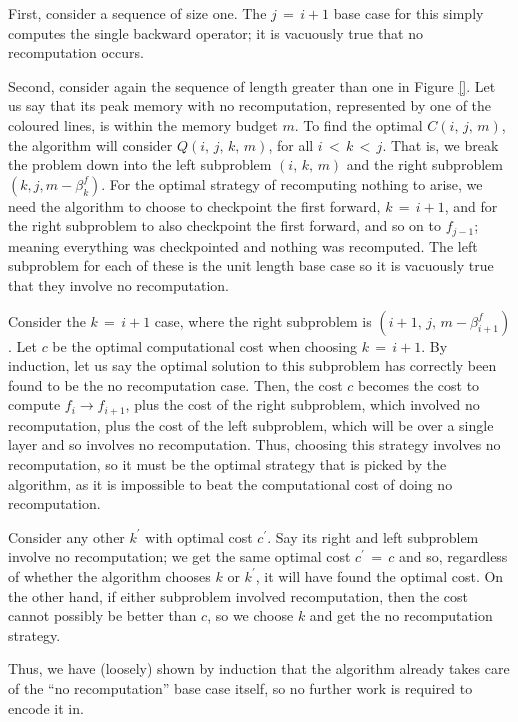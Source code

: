 First, consider a sequence of size one.
The \(j\,=\,i+1\) base case for this simply computes the single backward operator; it is vacuously true that no recomputation occurs.

Second, consider again the sequence of length greater than one in Figure \ref{}.
Let us say that its peak memory with no recomputation, represented by one of the coloured lines, is within the memory budget \(m\).
To find the optimal \(C(i,\,j,\,m)\), the algorithm will consider \(Q(i,\,j,\,k,\,m)\), for all \(i \,<\, k \,<\, j\).
That is, we break the problem down into the left subproblem \((i,\,k,\,m)\) and the right subproblem \((k,j,m-\beta^f_k)\).
For the optimal strategy of recomputing nothing to arise, we need the algorithm to choose to checkpoint the first forward, \(k\,=\,i+1\), and for the right subproblem to also checkpoint the first forward, and so on to \(f_{j-1}\); meaning everything was checkpointed and nothing was recomputed.
The left subproblem for each of these is the unit length base case so it is vacuously true that they involve no recomputation.

Consider the \(k\,=\,i+1\) case, where the right subproblem is \((i+1,\,j,\,m-\beta^f_{i+1})\).
Let \(c\) be the optimal computational cost when choosing \(k\,=\,i+1\).
By induction, let us say the optimal solution to this subproblem has correctly been found to be the no recomputation case.
Then, the cost \(c\) becomes the cost to compute \(f_i\rightarrow f_{i+1}\), plus the cost of the right subproblem, which involved no recomputation, plus the cost of the left subproblem, which will be over a single layer and so involves no recomputation.
Thus, choosing this strategy involves no recomputation, so it must be the optimal strategy that is picked by the algorithm, as it is impossible to beat the computational cost of doing no recomputation.

Consider any other \(k^\prime\) with optimal cost \(c^\prime\).
Say its right and left subproblem involve no recomputation;
we get the same optimal cost \(c^\prime\,=\,c\) and so, regardless of whether the algorithm chooses \(k\) or \(k^\prime\), it will have found the optimal cost.
On the other hand, if either subproblem involved recomputation, then the cost cannot possibly be better than \(c\), so we choose \(k\) and get the no recomputation strategy.

Thus, we have (loosely) shown by induction that the algorithm already takes care of the ``no recomputation'' base case itself, so no further work is required to encode it in.

